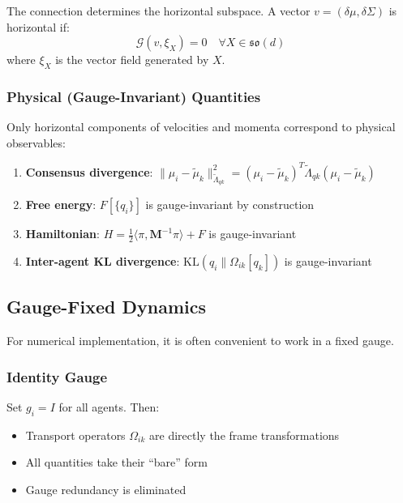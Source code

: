 \documentclass[12pt]{article}
\begin{document}
The connection determines the horizontal subspace. A vector $v = (\delta\mu, \delta\Sigma)$ is horizontal if:
\begin{equation}
\mathcal{G}(v, \xi_X) = 0 \quad \forall X \in \mathfrak{so}(d)
\end{equation}
where $\xi_X$ is the vector field generated by $X$.

\subsubsection{Physical (Gauge-Invariant) Quantities}

Only horizontal components of velocities and momenta correspond to physical observables:

\begin{enumerate}
    \item \textbf{Consensus divergence}: $\|\mu_i - \tilde{\mu}_k\|_{\tilde{\Lambda}_{qk}}^2 = (\mu_i - \tilde{\mu}_k)^T\tilde{\Lambda}_{qk}(\mu_i - \tilde{\mu}_k)$
    
    \item \textbf{Free energy}: $F[\{q_i\}]$ is gauge-invariant by construction
    
    \item \textbf{Hamiltonian}: $H = \frac{1}{2}\langle\pi, \mathbf{M}^{-1}\pi\rangle + F$ is gauge-invariant
    
    \item \textbf{Inter-agent KL divergence}: $\mathrm{KL}(q_i \| \Omega_{ik}[q_k])$ is gauge-invariant
\end{enumerate}

\subsection{Gauge-Fixed Dynamics}

For numerical implementation, it is often convenient to work in a fixed gauge.

\subsubsection{Identity Gauge}

Set $g_i = I$ for all agents. Then:
\begin{itemize}
    \item Transport operators $\Omega_{ik}$ are directly the frame transformations
    \item All quantities take their ``bare'' form
    \item Gauge redundancy is eliminated
\end{itemize}
\end{document}
